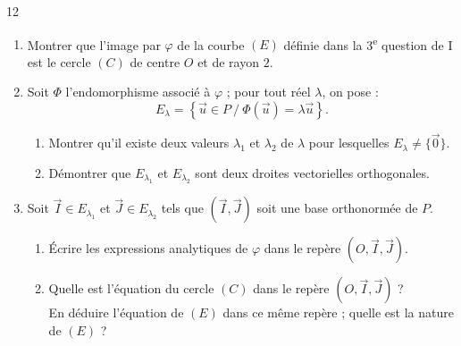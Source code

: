 \documentclass{axiobac}
\begin{document}
\begin{probleme}{12}
\begin{enumerate}
    \item Montrer que l'image par $\varphi$ de la courbe $(E)$ définie dans la 3\textsuperscript{e} question de I est le cercle $(C)$ de centre $O$ et de rayon $2$.
    \item Soit $\Phi$ l'endomorphisme associé à $\varphi$ ; pour tout réel $\lambda$, on pose :
    \[
    E_\lambda = \left\{ \vec{u} \in P \ / \ \Phi(\vec{u}) = \lambda \vec{u} \right\} .
    \]
    \begin{enumerate}
        \item Montrer qu'il existe deux valeurs $\lambda_1$ et $\lambda_2$ de $\lambda$ pour lesquelles $E_\lambda \neq \{\vec{0}\}$.
        \item Démontrer que $E_{\lambda_1}$ et $E_{\lambda_2}$ sont deux droites vectorielles orthogonales.
    \end{enumerate}
    \item Soit $\vec{I} \in E_{\lambda_1}$ et $\vec{J} \in E_{\lambda_2}$ tels que $(\vec{I}, \vec{J})$ soit une base orthonormée de $P$.
    \begin{enumerate}
        \item Écrire les expressions analytiques de $\varphi$ dans le repère $(O, \vec{I}, \vec{J})$.
        \item Quelle est l'équation du cercle $(C)$ dans le repère $(O, \vec{I}, \vec{J})$ ? \\
        En déduire l'équation de $(E)$ dans ce même repère ; quelle est la nature de $(E)$ ?
    \end{enumerate}
\end{enumerate}

\end{probleme}
\end{document}

